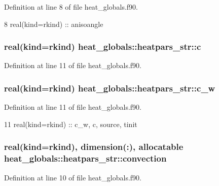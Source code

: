 Definition at line 8 of file heat\+\_\+globals.\+f90.


\begin{DoxyCode}
8     \textcolor{keywordtype}{real(kind=rkind)} :: anisoangle
\end{DoxyCode}
\subsubsection[{c}]{\setlength{\rightskip}{0pt plus 5cm}real(kind=rkind) heat\+\_\+globals\+::heatpars\+\_\+str\+::c}\label{structheat__globals_1_1heatpars__str_a8c58037513d67cff72e4efbae1908bab}


Definition at line 11 of file heat\+\_\+globals.\+f90.

\subsubsection[{c\+\_\+w}]{\setlength{\rightskip}{0pt plus 5cm}real(kind=rkind) heat\+\_\+globals\+::heatpars\+\_\+str\+::c\+\_\+w}\label{structheat__globals_1_1heatpars__str_a56c3870dcf55d6e478d1c08e7d122bc6}


Definition at line 11 of file heat\+\_\+globals.\+f90.


\begin{DoxyCode}
11     \textcolor{keywordtype}{real(kind=rkind)} :: c\_w, c, source, tinit
\end{DoxyCode}
\subsubsection[{convection}]{\setlength{\rightskip}{0pt plus 5cm}real(kind=rkind), dimension(\+:), allocatable heat\+\_\+globals\+::heatpars\+\_\+str\+::convection}\label{structheat__globals_1_1heatpars__str_a3a7d5daa996ed1a1f9aa9a0fc472c52c}


Definition at line 10 of file heat\+\_\+globals.\+f90.

